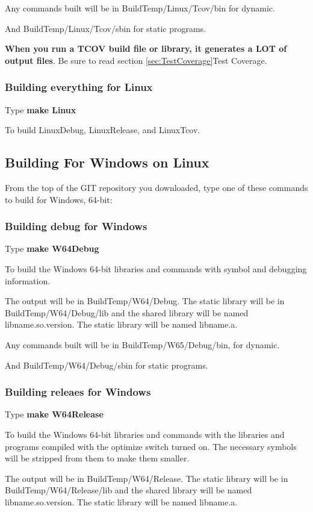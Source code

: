 Any commands built will be in BuildTemp/Linux/Tcov/bin
for dynamic.

And BuildTemp/Linux/Tcov/sbin for static programs.

\textbf{When you run a TCOV build file or library, it generates a LOT of  output files}. Be sure to read section \ref{sec:TestCoverage}{Test Coverage}.
  
\subsubsection{Building everything for Linux}
Type \textbf{make Linux}

To build LinuxDebug, LinuxRelease, and LinuxTcov.

\subsection{Building For Windows on Linux}
  
From the top of the GIT repository you downloaded,
type one of these commands to build for Windows, 64-bit:


\subsubsection{Building debug for Windows}
Type \textbf{make W64Debug}

 To build the Windows 64-bit libraries and commands with symbol
 and debugging information.

 The output will be in BuildTemp/W64/Debug.
 The static library will be in BuildTemp/W64/Debug/lib
 and the shared library will be named lib{name}.so.{version}.
 The static library will be named lib{name}.a.
  
 Any commands built will be in BuildTemp/W65/Debug/bin,
 for dynamic.
  
 And BuildTemp/W64/Debug/sbin for static programs.

\subsubsection{Building releaes for Windows}
Type \textbf{make W64Release}

To build the Windows 64-bit libraries and commands with the libraries
and programs compiled with the optimize switch turned on.
The necessary symbols will be stripped from them to make
them smaller.

The output will be in BuildTemp/W64/Release.
The static library will be in BuildTemp/W64/Release/lib
and the shared library will be named lib{name}.so.{version}.
The static library will be named lib{name}.a.
  
